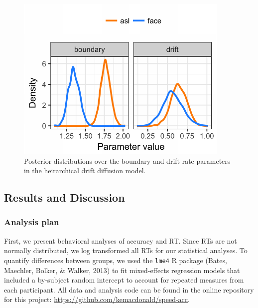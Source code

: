 \documentclass[10pt, letterpaper]{article}
\newenvironment{CodeChunk}{}{}
\begin{document}
\begin{CodeChunk}
\begin{figure}[t]

{\centering \includegraphics{figs/e1_hddm_plot-1} 

}

\caption[Posterior distributions over the boundary and drift rate parameters in the heirarchical drift diffusion model]{Posterior distributions over the boundary and drift rate parameters in the heirarchical drift diffusion model.}\label{fig:e1_hddm_plot}
\end{figure}
\end{CodeChunk}

\subsection{Results and Discussion}\label{results-and-discussion}

\subsubsection{Analysis plan}\label{analysis-plan}

First, we present behavioral analyses of accuracy and RT. Since RTs are
not normally distributed, we log transformed all RTs for our statistical
analyses. To quantify differences between groups, we used the
\texttt{lme4} R package (Bates, Maechler, Bolker, \& Walker, 2013) to
fit mixed-effects regression models that included a by-subject random
intercept to account for repeated measures from each participant. All
data and analysis code can be found in the online repository for this
project: \url{https://github.com/kemacdonald/speed-acc}.
\end{document}
